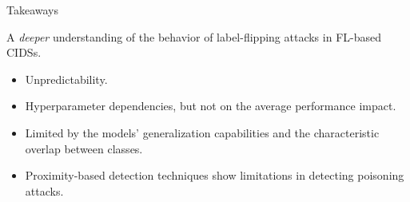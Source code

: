 \begin{frame}{Takeaways}

  A \emph{deeper} understanding of the behavior of label-flipping attacks in FL-based CIDSs.
  \begin{itemize}\small
    \item Unpredictability.
    \item Hyperparameter dependencies, but not on the average performance impact.
    \item Limited by the models' generalization capabilities and the characteristic overlap between classes.
    \item Proximity-based detection techniques show limitations in detecting poisoning attacks.
  \end{itemize}
  
\end{frame}






